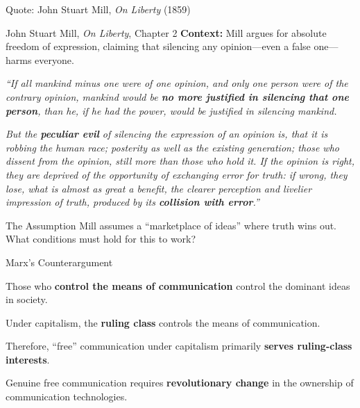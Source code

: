 \documentclass[aspectratio=169,11pt]{beamer}
\begin{document}
\begin{frame}{Quote: John Stuart Mill, \textit{On Liberty} (1859)}
\begin{exampleblock}{\faQuoteLeft\hspace{0.5em}John Stuart Mill, \textit{On Liberty}, Chapter 2 \parencite{mill1859liberty}}
\small
\textbf{Context:} Mill argues for absolute freedom of expression, claiming that silencing any opinion---even a false one---harms everyone.

\vspace{0.5em}
\textit{``If all mankind minus one were of one opinion, and only one person were of the contrary opinion, mankind would be \textbf{no more justified in silencing that one person}, than he, if he had the power, would be justified in silencing mankind.}

\vspace{0.3em}
\textit{But the \textbf{peculiar evil} of silencing the expression of an opinion is, that it is robbing the human race; posterity as well as the existing generation; those who dissent from the opinion, still more than those who hold it. If the opinion is right, they are deprived of the opportunity of exchanging error for truth: if wrong, they lose, what is almost as great a benefit, the clearer perception and livelier impression of truth, produced by its \textbf{collision with error}.''}
\end{exampleblock}

\vspace{0.2em}
\begin{block}{\faLightbulb\hspace{0.5em}The Assumption}
Mill assumes a ``marketplace of ideas'' where truth wins out. What conditions must hold for this to work?
\end{block}
\end{frame}

\begin{frame}{Marx's Counterargument}
\begin{argument}
  \item Those who \textbf{control the means of communication} control the dominant ideas in society.
  \item Under capitalism, the \textbf{ruling class} controls the means of communication.
  \item Therefore, ``free'' communication under capitalism primarily \textbf{serves ruling-class interests}.
  \item[\textbf{$\therefore$}] Genuine free communication requires \textbf{revolutionary change} in the ownership of communication technologies.
\end{argument}

\vspace{0.5em}
\end{frame}
\end{document}
